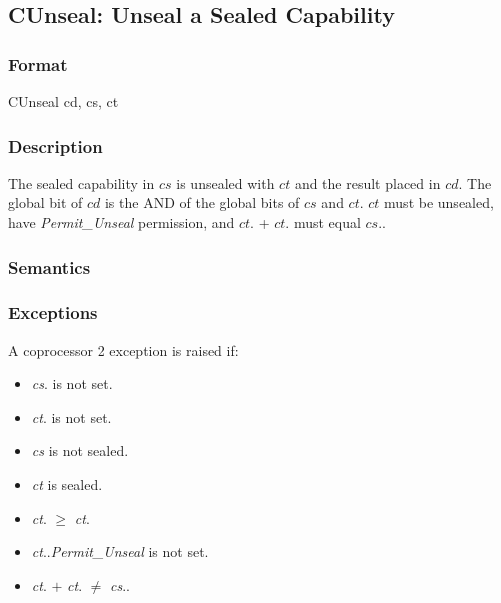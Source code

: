 \clearpage
{}
{}
\subsection*{CUnseal: Unseal a Sealed Capability}

\subsubsection*{Format}

CUnseal cd, cs, ct

\begin{center}
\end{center}

\subsubsection*{Description}

The sealed capability in $cs$ is unsealed with $ct$ and the result placed
in $cd$. The global bit of $cd$ is the AND of the global bits of
$cs$ and $ct$. $ct$ must be unsealed, have \emph{Permit\_Unseal} permission, and $ct$.\cbase{} + $ct$.\coffset{} must equal $cs$.\cotype{}.

\subsubsection*{Semantics}


\subsubsection*{Exceptions}

A coprocessor 2 exception is raised if:

\begin{itemize}
\item
\emph{cs}.\ctag{} is not set.
\item
\emph{ct}.\ctag{} is not set.
\item
\emph{cs} is not sealed.
\item
\emph{ct} is sealed.
\item
\emph{ct}.\coffset{} $\ge$ \emph{ct}.\clength{}
\item
\emph{ct}.\cperms{}.\emph{Permit\_Unseal} is not set.
\item
\emph{ct}.\cbase{} $+$ \emph{ct}.\coffset{} $\ne$ \emph{cs}.\cotype{}.
\end{itemize}

